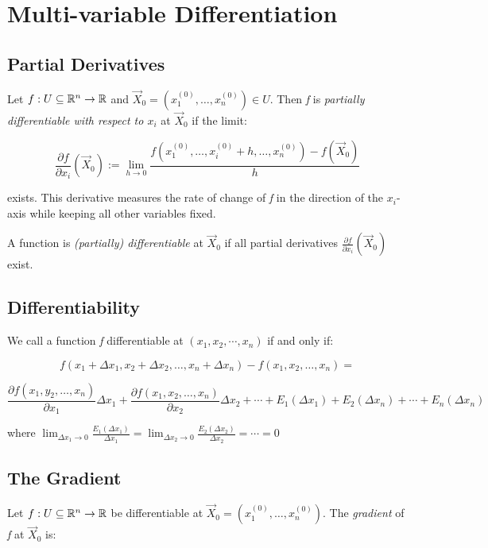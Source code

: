 \newpage
\section{Multi-variable Differentiation}

\subsection{Partial Derivatives}

Let \( f : U \subseteq \mathbb{R}^n \to \mathbb{R} \) and \( \vec{X}_0 = (x_1^{(0)}, \dots, x_n^{(0)}) 
\in U \). Then \emph{f} is \emph{partially differentiable with respect to \( x_i \)} at 
\( \vec{X}_0 \) if the limit:

\[
    \frac{\partial f}{\partial x_i}(\vec{X}_0) := \lim_{h \to 0} \frac{f(x_1^{(0)}, \dots, x_i^{(0)} + h,
     \dots, x_n^{(0)}) - f(\vec{X}_0)}{h}
\]

exists. This derivative measures the rate of change of \emph{f} in the direction of the \( x_i \)-axis 
while keeping all other variables fixed.

A function is \emph{(partially) differentiable} at \( \vec{X}_0 \) if all partial derivatives 
\( \frac{\partial f}{\partial x_i}(\vec{X}_0) \) exist.

\subsection{Differentiability}

We call a function \emph{f} differentiable at \((x_1, x_2, \cdots, x_n)\) if and only if:

\[
    f(x_1 + \Delta x_1, x_2 + \Delta x_2, \dots, x_n + \Delta x_n) - f(x_1, x_2, \dots, x_n) = 
\]

\[
    \frac{\partial f(x_1, y_2, \dots, x_n)}{\partial x_1} \Delta x_1 + \frac{\partial f(x_1, x_2, 
    \dots, x_n)}{\partial x_2} \Delta x_2 + \cdots + E_1(\Delta x_1) + E_2(\Delta x_n) + \cdots + 
    E_n(\Delta x_n)
\]

where \(\lim_{\Delta x_1 \to 0}\frac{E_1(\Delta x_1)}{\Delta x_1} = \lim_{\Delta x_2 \to 0}
\frac{E_2(\Delta x_2)}{\Delta x_2} = \cdots = 0\)

\subsection{The Gradient}

Let \( f : U \subseteq \mathbb{R}^n \to \mathbb{R} \) be differentiable at \( \vec{X}_0 = (x_1^{(0)}, 
\dots, x_n^{(0)}) \). The \emph{gradient} of \emph{f} at \( \vec{X}_0 \) is:

